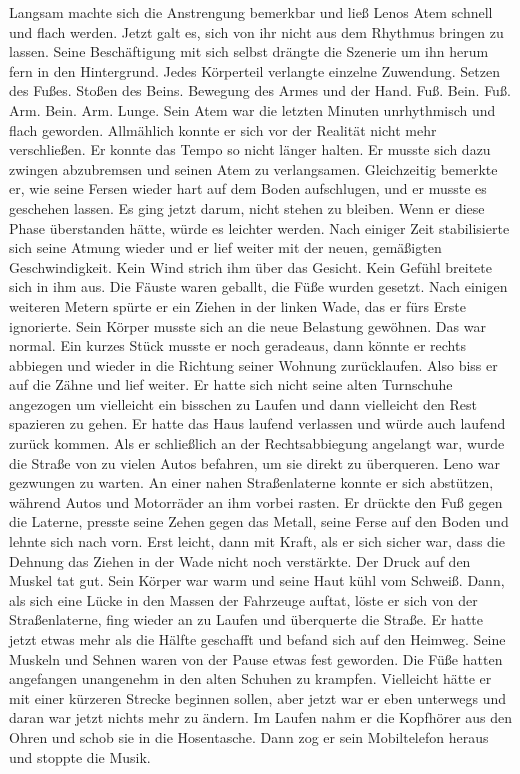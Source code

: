 \documentclass[ngerman,smalldemyvopaper,11pt,oneside,onecolumn,openright,extrafontsizes]{memoir}
\begin{document}
Langsam machte sich die Anstrengung bemerkbar und ließ Lenos Atem schnell und flach werden. Jetzt galt es, sich von ihr nicht aus dem Rhythmus bringen zu lassen. Seine Beschäftigung mit sich selbst drängte die Szenerie um ihn herum fern in den Hintergrund. Jedes Körperteil verlangte einzelne Zuwendung. Setzen des Fußes. Stoßen des Beins. Bewegung des Armes und der Hand. Fuß. Bein. Fuß. Arm. Bein. Arm. Lunge. Sein Atem war die letzten Minuten unrhythmisch und flach geworden. Allmählich konnte er sich vor der Realität nicht mehr verschließen. Er konnte das Tempo so nicht länger halten. Er musste sich dazu zwingen abzubremsen und seinen Atem zu verlangsamen. Gleichzeitig bemerkte er, wie seine Fersen wieder hart auf dem Boden aufschlugen, und er musste es geschehen lassen. Es ging jetzt darum, nicht stehen zu bleiben. Wenn er diese Phase überstanden hätte, würde es leichter werden. Nach einiger Zeit stabilisierte sich seine Atmung wieder und er lief weiter mit der neuen, gemäßigten Geschwindigkeit. Kein Wind strich ihm über das Gesicht. Kein Gefühl breitete sich in ihm aus. Die Fäuste waren geballt, die Füße wurden gesetzt. Nach einigen weiteren Metern spürte er ein Ziehen in der linken Wade, das er fürs Erste ignorierte. Sein Körper musste sich an die neue Belastung gewöhnen. Das war normal. Ein kurzes Stück musste er noch geradeaus, dann könnte er rechts abbiegen und wieder in die Richtung seiner Wohnung zurücklaufen. Also biss er auf die Zähne und lief weiter. Er hatte sich nicht seine alten Turnschuhe angezogen um vielleicht ein bisschen zu Laufen und dann vielleicht den Rest spazieren zu gehen. Er hatte das Haus laufend verlassen und würde auch laufend zurück kommen. Als er schließlich an der Rechtsabbiegung angelangt war, wurde die Straße von zu vielen Autos befahren, um sie direkt zu überqueren. Leno war gezwungen zu warten. An einer nahen Straßenlaterne konnte er sich abstützen, während Autos und Motorräder an ihm vorbei rasten. Er drückte den Fuß gegen die Laterne, presste seine Zehen gegen das Metall, seine Ferse auf den Boden und lehnte sich nach vorn. Erst leicht, dann mit Kraft, als er sich sicher war, dass die Dehnung das Ziehen in der Wade nicht noch verstärkte. Der Druck auf den Muskel tat gut. Sein Körper war warm und seine Haut kühl vom Schweiß. Dann, als sich eine Lücke in den Massen der Fahrzeuge auftat, löste er sich von der Straßenlaterne, fing wieder an zu Laufen und überquerte die Straße. Er hatte jetzt etwas mehr als die Hälfte geschafft und befand sich auf den Heimweg. Seine Muskeln und Sehnen waren von der Pause etwas fest geworden. Die Füße hatten angefangen unangenehm in den alten Schuhen zu krampfen. Vielleicht hätte er mit einer kürzeren Strecke beginnen sollen, aber jetzt war er eben unterwegs und daran war jetzt nichts mehr zu ändern. Im Laufen nahm er die Kopfhörer aus den Ohren und schob sie in die Hosentasche. Dann zog er sein Mobiltelefon heraus und stoppte die Musik.
\end{document}
